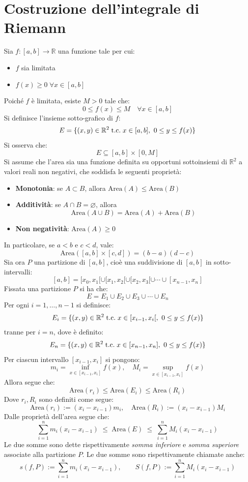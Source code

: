 \documentclass[a4paper,12pt,openright]{book}
\begin{document}
	\section{Costruzione dell'integrale di Riemann}
	Sia $f : [a,b] \longrightarrow \mathbb{R}$ una funzione tale per cui:
	\begin{itemize}
		\item $f$ sia limitata
		\item $f(x) \geq 0 \; \forall x \in [a,b]$
	\end{itemize}
	Poiché $f$ è limitata, esiste $M > 0$ tale che:
	\[0 \leq f(x) \leq M \quad \forall x \in [a,b]\]
	Si definisce l'insieme sotto-grafico di $f$:
	\[E = \{(x,y) \in \mathbb{R}^2 \;\text{t.c.}\; x \in [a,b],\ 0 \leq y \leq f(x)\}\]
	Si osserva che:
	\[E \subseteq [a,b] \times [0,M]\]
	Si assume che l'area sia una funzione definita su opportuni sottoinsiemi di $\mathbb{R}^2$ a valori reali non negativi, che soddisfa le seguenti proprietà:
	\begin{itemize}
		\item \textbf{Monotonia}: se $A \subset B$, allora $\mathrm{Area}(A) \leq \mathrm{Area}(B)$
		\item \textbf{Additività}: se $A \cap B = \varnothing$, allora
		\[
		\mathrm{Area}(A \cup B) = \mathrm{Area}(A) + \mathrm{Area}(B)
		\]
		\item \textbf{Non negatività}: $\mathrm{Area}(A) \geq 0$
	\end{itemize}
	In particolare, se $a<b$ e $c<d$, vale:
	\[\mathrm{Area}([a,b] \times [c,d]) = (b-a)(d-c)\]
	Sia ora $P$ una partizione di $[a,b]$, cioè una suddivisione di $[a, b]$ in sotto-intervalli:
	\[[a, b] = [x_0, x_1[ \cup [x_1, x_2[ \cup [x_2, x_3[ \cup \cdots \cup [x_{n-1}, x_n]\]
	Fissata una partizione $P$ si ha che:
	\[E = E_1 \cup E_2 \cup E_3 \cup \cdots \cup E_n\]
	Per ogni $i = 1, \dots, n - 1$ si definisce:
	\[E_i = \{(x,y) \in \mathbb{R}^2 \;\text{t.c.}\; x \in [x_{i-1},x_i[,\ 0 \leq y \leq f(x)\}\]
	tranne per $i = n$, dove è definito:
	\[E_n = \{(x,y) \in \mathbb{R}^2 \;\text{t.c.}\; x \in [x_{n-1},x_n],\ 0 \leq y \leq f(x)\}\]
	Per ciascun intervallo $[x_{i-1},x_i]$ si pongono:
	\[m_i = \inf_{x \in [x_{i-1},x_i]} f(x), \quad M_i = \sup_{x \in [x_{i-1},x_i]} f(x)\]
	Allora segue che:
	\[\mathrm{Area}(r_i) \leq \mathrm{Area}(E_i) \leq \mathrm{Area}(R_i)\]
	Dove $r_i, R_i$ sono definiti come segue:
	\[\mathrm{Area}(r_i) := (x_i - x_{i - 1})m_i, \quad \mathrm{Area}(R_i) := (x_i - x_{i - 1})M_i\]
	Dalle proprietà dell'area segue che:
	\[\sum_{i=1}^n m_i (x_i - x_{i-1})
	\;\leq\;
	\mathrm{Area}(E)
	\;\leq\;
	\sum_{i=1}^n M_i (x_i - x_{i-1})\]
	Le due somme sono dette rispettivamente \emph{somma inferiore} e \emph{somma superiore} associate alla partizione $P$. Le due somme sono rispettivamente chiamate anche:
	\[s(f, P) := \sum_{i=1}^n m_i (x_i - x_{i-1}), \quad \quad S(f, P) := \sum_{i=1}^n M_i (x_i - x_{i-1})\]
	
\end{document}
